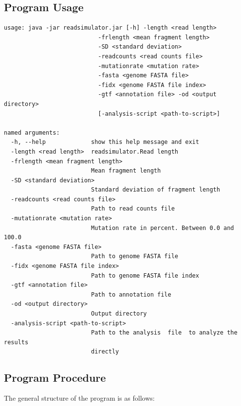 \documentclass{article}
\begin{document}
    \subsection{Program Usage}
    \begin{verbatim}
usage: java -jar readsimulator.jar [-h] -length <read length>
                           -frlength <mean fragment length>
                           -SD <standard deviation>
                           -readcounts <read counts file>
                           -mutationrate <mutation rate>
                           -fasta <genome FASTA file>
                           -fidx <genome FASTA file index>
                           -gtf <annotation file> -od <output directory>
                           [-analysis-script <path-to-script>]

named arguments:
  -h, --help             show this help message and exit
  -length <read length>  readsimulator.Read length
  -frlength <mean fragment length>
                         Mean fragment length
  -SD <standard deviation>
                         Standard deviation of fragment length
  -readcounts <read counts file>
                         Path to read counts file
  -mutationrate <mutation rate>
                         Mutation rate in percent. Between 0.0 and 100.0
  -fasta <genome FASTA file>
                         Path to genome FASTA file
  -fidx <genome FASTA file index>
                         Path to genome FASTA file index
  -gtf <annotation file>
                         Path to annotation file
  -od <output directory>
                         Output directory
  -analysis-script <path-to-script>
                         Path to the analysis  file  to analyze the results
                         directly
    \end{verbatim}

    \subsection{Program Procedure}
    The general structure of the program is as follows:
\end{document}
